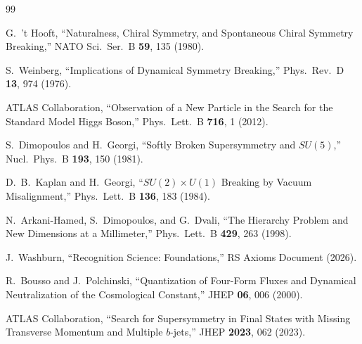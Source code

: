 \documentclass[12pt,a4paper]{article}
\theoremstyle{definition}
\theoremstyle{remark}
\begin{document}
\begin{thebibliography}{99}

G.~'t Hooft, ``Naturalness, Chiral Symmetry, and
Spontaneous Chiral Symmetry Breaking,'' NATO Sci.\ Ser.\
B \textbf{59}, 135 (1980).

S.~Weinberg, ``Implications of Dynamical Symmetry
Breaking,'' Phys.\ Rev.\ D \textbf{13}, 974 (1976).

ATLAS Collaboration, ``Observation of a New Particle in
the Search for the Standard Model Higgs Boson,'' Phys.\
Lett.\ B \textbf{716}, 1 (2012).

S.~Dimopoulos and H.~Georgi, ``Softly Broken
Supersymmetry and $SU(5)$,'' Nucl.\ Phys.\ B \textbf{193},
150 (1981).

D.~B.~Kaplan and H.~Georgi, ``$SU(2) \times U(1)$ Breaking
by Vacuum Misalignment,'' Phys.\ Lett.\ B \textbf{136},
183 (1984).

N.~Arkani-Hamed, S.~Dimopoulos, and G.~Dvali, ``The
Hierarchy Problem and New Dimensions at a Millimeter,''
Phys.\ Lett.\ B \textbf{429}, 263 (1998).

J.~Washburn, ``Recognition Science: Foundations,''
RS Axioms Document (2026).

R.~Bousso and J.~Polchinski, ``Quantization of Four-Form
Fluxes and Dynamical Neutralization of the Cosmological
Constant,'' JHEP \textbf{06}, 006 (2000).

ATLAS Collaboration, ``Search for Supersymmetry in Final
States with Missing Transverse Momentum and Multiple
$b$-jets,'' JHEP \textbf{2023}, 062 (2023).

\end{thebibliography}
\end{document}
